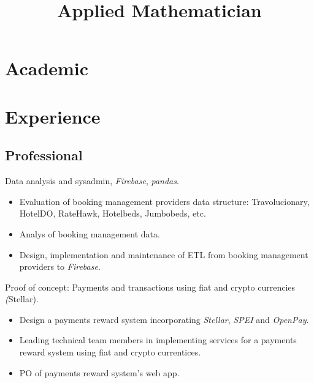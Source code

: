 \documentclass[11pt,letter]{moderncv}
\title{Applied \mbox{Mathematician}}
\begin{document}
\maketitle

\section{Academic}
\label{sec:formacion-academica}


\section{Experience}
\label{sec:experiencia}
\subsection{Professional}
\label{sec:profesional}


 {Data analysis and sysadmin, \emph{Firebase}, \emph{pandas}.
  \begin{itemize}
  \item Evaluation of booking management providers data structure: Travolucionary, HotelDO, RateHawk, Hotelbeds, Jumbobeds, etc.
  \item Analys of booking management data.
  \item Design, implementation and maintenance of ETL from booking management providers to \emph{Firebase}.
  \end{itemize}
}

 {Proof of concept: Payments and transactions using fiat and crypto currencies \emph(Stellar).
  \begin{itemize}
  \item Design a payments reward system incorporating \emph{Stellar}, \emph{SPEI} and \emph{OpenPay}.
  \item Leading technical team members in implementing services for a payments reward system using fiat and crypto currentices.
  \item PO of payments reward system's web app.
  \end{itemize}
}
\end{document}
